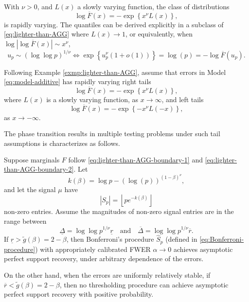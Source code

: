\begin{example} \label{exmp:lighter-than-AGG}
With $\nu>0$, and $L(x)$ a slowly varying function, the class of distributions
\begin{equation} \label{eq:lighter-than-AGG}
    \log{\overline{F}(x)} = - \exp{\left\{x^\nu L(x)\right\}},
\end{equation}
is rapidly varying.
The quantiles can be derived explicitly in a subclass of \eqref{eq:lighter-than-AGG} where $L(x)\to 1$, or equivalently, when $\log{|\log{\overline{F}(x)}|}\sim x^\nu$,
\begin{equation*}
    u_p \sim \left(\log \log{p}\right)^{1/\nu}
    \iff \exp{\left\{u_p^\nu\left(1+o(1)\right)\right\}} = \log(p) = - \log \overline{F}(u_p).
\end{equation*}
\end{example}


Following Example \ref{exmp:lighter-than-AGG}, assume that errors in Model \eqref{eq:model-additive} has rapidly varying right tails
\begin{equation} \label{eq:lighter-than-AGG-boundary-1}
        \log{\overline{F}(x)} = - \exp{\left\{x^\nu L(x)\right\}},
\end{equation}
where $L(x)$ is a slowly varying function, as $x\to\infty$, and left tails
\begin{equation} \label{eq:lighter-than-AGG-boundary-2}
        \log{\overline{F}(x)} = - \exp{\left\{-x^\nu L(-x)\right\}},
\end{equation}
as $x\to -\infty$.

The phase transition results in multiple testing problems under such tail assumptions is characterizes as follows.

\begin{theorem} \label{thm:lighter-than-AGG}
Suppose marginals $F$ follow \eqref{eq:lighter-than-AGG-boundary-1} and \eqref{eq:lighter-than-AGG-boundary-2}.
Let
$$
k(\beta) = \log{p} - \left(\log(p)\right)^{(1-\beta)^\nu},
$$
and let the signal $\mu$ have 
$$|S_p| = \left\lfloor pe^{-k(\beta)} \right\rfloor$$
non-zero entries. Assume the magnitudes of non-zero signal entries are in the range between
$$\underline{\Delta} = \log{\log{p}}^{1/\nu}\underline{r}
\quad\text{and}\quad
\overline{\Delta} = \log{\log{p}}^{1/\nu}\overline{r}.$$
If $\underline{r} > \widetilde{g}(\beta) = 2 - \beta$, then Bonferroni's procedure $\widehat{S}_p$ (defined in \eqref{eq:Bonferroni-procedure}) with appropriately calibrated FWER $\alpha\to 0$ achieves asymptotic perfect support recovery, under arbitrary dependence of the errors.

On the other hand, when the errors are uniformly relatively stable, if $\overline{r} < \widetilde{g}(\beta) = 2 - \beta$, then no thresholding procedure can achieve asymptotic perfect support recovery with positive probability.
\end{theorem}


